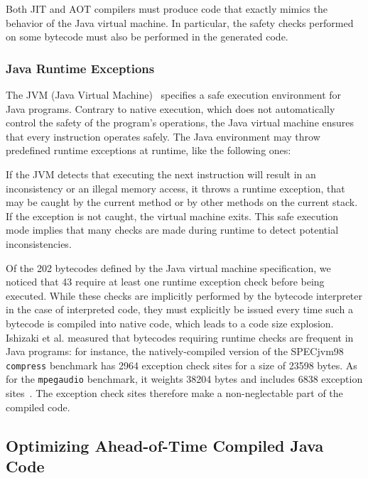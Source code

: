 Both JIT and AOT compilers must produce code that exactly mimics the behavior of the Java virtual machine. In particular, the safety checks performed on some bytecode must also be performed in the generated code.

\subsubsection{Java Runtime Exceptions}
\label{sec:runtimeexceptions}
The JVM (Java Virtual Machine)~\cite{VMSpec} specifies a safe execution environment for Java programs. Contrary to native execution, which does not automatically control the safety of the program's operations, the Java virtual machine ensures that every instruction operates safely. The Java environment may throw predefined runtime exceptions at runtime, like the following ones:

If the JVM detects that executing the next instruction will result in an inconsistency or an illegal memory access, it throws a runtime exception, that may be caught by the current method or by other methods on the current stack. If the exception is not caught, the virtual machine exits. This safe execution mode implies that many checks are made during runtime to detect potential inconsistencies. 

Of the 202 bytecodes defined by the Java virtual machine specification, we noticed that 43 require at least one runtime exception check before being executed. While these checks are implicitly performed by the bytecode interpreter in the case of interpreted code, they must explicitly be issued every time such a bytecode is compiled into native code, which leads to a code size explosion. Ishizaki et al. measured that bytecodes requiring runtime checks are frequent in Java programs: for instance, the natively-compiled version of the SPECjvm98 \texttt{compress} benchmark has 2964 exception check sites for a size of 23598 bytes. As for the \texttt{mpegaudio} benchmark, it weights 38204 bytes and includes 6838 exception sites~\cite{Ishizaki1999}. The exception check sites therefore make a non-neglectable part of the compiled code.

\subsection{Optimizing Ahead-of-Time Compiled Java Code}
\label{sec:method}

